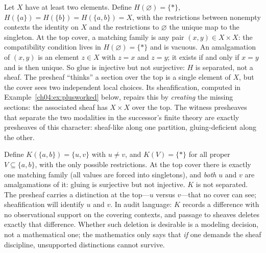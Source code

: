 \begin{example}\label{ch04:ex:separated}
Let $X$ have at least two elements. Define $H(\varnothing)=\{*\}$,
$H(\{a\})=H(\{b\})=H(\{a,b\})=X$, with the restrictions between nonempty
contexts the identity on $X$ and the restrictions to $\varnothing$ the unique
map to the singleton. At the top cover, a matching family is any pair
$(x,y)\in X\times X$: the compatibility condition lives in
$H(\varnothing)=\{*\}$ and is vacuous. An amalgamation of $(x,y)$ is an
element $z\in X$ with $z=x$ and $z=y$; it exists if and only if $x=y$ and is
then unique. So $\mathrm{glue}$ is injective but not surjective: $H$ is
separated, not a sheaf. The presheaf ``thinks'' a section over the top is a
single element of $X$, but the cover sees two independent local choices. Its
sheafification, computed in Example~\ref{ch04:ex:plusworked} below, repairs
this by \emph{creating} the missing sections: the associated sheaf has
$X\times X$ over the top. The witness presheaves that separate the two
modalities in the successor's finite theory are exactly presheaves of this
character: sheaf-like along one partition, gluing-deficient along the other.
\end{example}

\begin{example}\label{ch04:ex:nonseparated}
Define $K(\{a,b\})=\{u,v\}$ with $u\ne v$, and $K(V)=\{*\}$ for all proper
$V\subseteq\{a,b\}$, with the only possible restrictions. At the top cover
there is exactly one matching family (all values are forced into singletons),
and \emph{both} $u$ and $v$ are amalgamations of it: gluing is surjective but
not injective. $K$ is not separated. The presheaf carries a distinction at the
top---$u$ versus $v$---that no cover can see; sheafification will identify
$u$ and $v$. In audit language: $K$ records a difference with no observational
support on the covering contexts, and passage to sheaves deletes exactly that
difference. Whether such deletion is desirable is a modeling decision, not a
mathematical one; the mathematics only says that \emph{if} one demands the
sheaf discipline, unsupported distinctions cannot survive.
\end{example}

